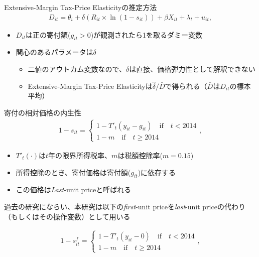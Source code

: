\documentclass[
  ignorenonframetext,
  aspectratio=169,
]{beamer}
\providecommand{\tightlist}{%
  \setlength{\itemsep}{0pt}\setlength{\parskip}{0pt}}
\begin{document}
\begin{frame}{Extensive-Margin Tax-Price Elasticityの推定方法}
\protect\hypertarget{extensive-margin-tax-price-elasticityux306eux63a8ux5b9aux65b9ux6cd5}{}
\begin{align}
  D_{it} = \theta_i + \delta (R_{it} \times \ln (1 - s_{it}))
  + \beta X_{it} + \lambda_t + u_{it}, \label{eq:extensive}
\end{align}

\begin{itemize}
\tightlist
\item
  \(D_{it}\)は正の寄付額(\(g_{it} > 0\))が観測されたら1を取るダミー変数
\item
  関心のあるパラメータは\(\delta\)

  \begin{itemize}
  \tightlist
  \item
    二値のアウトカム変数なので、\(\delta\)は直接、価格弾力性として解釈できない
  \item
    Extensive-Margin Tax-Price Elasticityは\(\hat{\delta} / \bar{D}\)で得られる（\(\bar{D}\)は\(D_{it}\)の標本平均）
  \end{itemize}
\end{itemize}
\end{frame}

\begin{frame}{寄付の相対価格の内生性}
\protect\hypertarget{ux5bc4ux4ed8ux306eux76f8ux5bfeux4fa1ux683cux306eux5185ux751fux6027}{}
\begin{align}
  1 - s_{it} =
  \begin{cases}
    1 - T'_t(y_{it} - g_{it})  \quad\text{if}\quad t < 2014  \\
    1 - m \quad\text{if}\quad t \ge 2014
  \end{cases},
\end{align}

\begin{itemize}
\tightlist
\item
  \(T'_t(\cdot)\)は\(t\)年の限界所得税率、\(m\)は税額控除率(\(m = 0.15\))
\item
  所得控除のとき、寄付価格は寄付額(\(g_{it}\))に依存する
\item
  この価格は\emph{Last}-unit priceと呼ばれる
\end{itemize}

過去の研究にならい、本研究は以下の\emph{first}-unit priceを\emph{last}-unit priceの代わり（もしくはその操作変数）として用いる

\begin{align}
  1 - s^f_{it} =
  \begin{cases}
    1 - T'_t(y_{it} - 0)  \quad\text{if}\quad t < 2014  \\
    1 - m \quad\text{if}\quad t \ge 2014
  \end{cases},
\end{align}
\end{frame}
\end{document}
